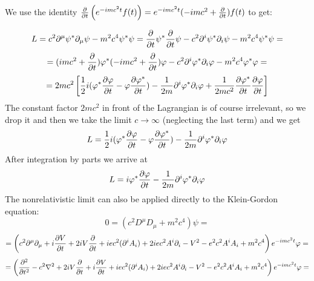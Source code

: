 We use the identity ${\partial\over\partial t}\left(e^{-imc^2t}f(t)\right)= e^{-imc^2t}(-imc^2+{\partial\over\partial t})f(t)$ to get:


\begin{equation*}
  L=c^2\partial^\mu\psi^*\partial_\mu\psi-m^2c^4\psi^*\psi= {\partial\over\partial t}\psi^*{\partial\over\partial t}\psi -c^2\partial^i\psi^*\partial_i\psi-m^2c^4\psi^*\psi=
\end{equation*}
\begin{equation*}
  =(imc^2+{\partial\over\partial t})\varphi^* (-imc^2+{\partial\over\partial t})\varphi -c^2\partial^i\varphi^*\partial_i\varphi-m^2c^4\varphi^*\varphi=
\end{equation*}
\begin{equation*}
  =2mc^2\left[{1\over2}i(\varphi^*{\partial\varphi\over\partial t}- \varphi{\partial\varphi^*\over\partial t})- {1\over2m}\partial^i\varphi^*\partial_i\varphi +{1\over2mc^2}{\partial\varphi^*\over\partial t} {\partial\varphi\over\partial t}\right]
\end{equation*}
The constant factor $2mc^2$ in front of the Lagrangian is of course irrelevant, so we drop it and then we take the limit $c\to\infty$ (neglecting the last term) and we get 
\begin{equation*}
  L={1\over2}i(\varphi^*{\partial\varphi\over\partial t}- \varphi{\partial\varphi^*\over\partial t})- {1\over2m}\partial^i\varphi^*\partial_i\varphi
\end{equation*}
After integration by parts we arrive at 
\begin{equation*}
  L=i\varphi^*{\partial\varphi\over\partial t} -{1\over 2m}\partial^i\varphi^*\partial_i \varphi
\end{equation*}
The nonrelativistic limit can also be applied directly to the Klein-Gordon equation: 
\begin{equation*}
  0=(c^2D^\mu D_\mu+m^2c^4)\psi=
\end{equation*}
\begin{equation*}
  =\left( c^2\partial^\mu\partial_\mu +i{\partial V\over\partial t} +2iV{\partial\over\partial t} +iec^2(\partial^i A_i) +2iec^2A^i\partial_i -V^2 -e^2c^2A^iA_i +m^2c^4 \right)e^{-imc^2t}\varphi=
\end{equation*}
\begin{equation*}
  =\left( {\partial^2\over\partial t^2} -c^2\nabla^2 +2iV{\partial\over\partial t} +i{\partial V\over\partial t} +iec^2(\partial^i A_i) +2iec^2A^i\partial_i -V^2 -e^2c^2A^iA_i +m^2c^4 \right)e^{-imc^2t}\varphi=
\end{equation*}
